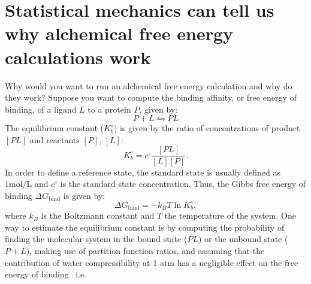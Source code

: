 \documentclass[9pt,bestpractices]{livecoms}
\begin{document}
\section{Statistical mechanics can tell us why alchemical free energy calculations work}
\label{sec:theory}
Why would you want to run an alchemical free energy calculation and why do they work? Suppose you want to compute the binding affinity, or free energy of binding, of a ligand $L$ to a protein $P$, given by:
\begin{equation}
P+L\leftrightharpoons PL
\end{equation}
The equilibrium constant  ($K_b^{\circ}$) is given by the ratio of concentrations of product $[PL]$ and reactants $[P]$, $[L]$:
\begin{equation}
 K_b^{\circ} = c^{\circ}\frac{[PL]}{[L][P]}.
\end{equation}
In order to define a reference state, the standard state is usually defined as $1 \mathrm{mol}/\mathrm{L}$ and $c^\circ$ is the standard state concentration. Thus, the Gibbs free energy of binding $\Delta G_{\mathrm{bind}}$ is given by:
\begin{equation}
    \Delta G_{\mathrm{bind}} = -k_BT\ln K_b^{\circ},
\end{equation}
where $k_B$ is the Boltzmann constant and $T$ the temperature of the system. 
One way to estimate the equilibrium constant is by computing the probability of finding the molecular system in the bound state ($PL$) or the unbound state ($P+L$), making use of partition function ratios, and assuming that the contribution of water compressibility at 1 atm has a negligible effect on the free energy of binding~\cite{shirts2012best, gilson1997statisticalthermodynamic} i.e. 
\end{document}
